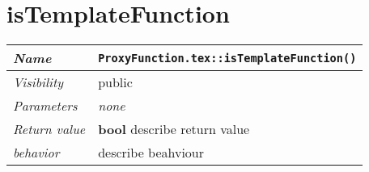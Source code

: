  \section{isTemplateFunction}
\begin{longtable}{p{3cm} @{\hskip 1cm} p{12cm}}
 \hline
\textit{Name} & \texttt{ProxyFunction.tex::isTemplateFunction()}\\
\hline
 \textit{Visibility} & public\\
\hline
\textit{Parameters} & \textit{none}\\
\hline
\textit{Return value} & \textbf{ bool} describe return value\\
  \hline
 \textit{behavior} & describe beahviour \\
\hline
\end{longtable} \pagebreak
 
